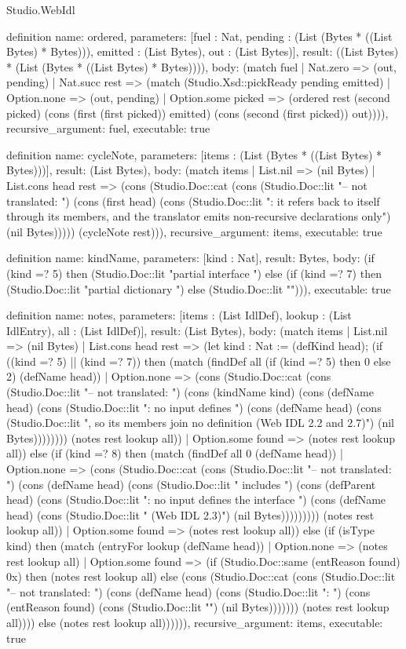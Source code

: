 \begin{lexlean}{Studio.WebIdl}
\begin{semanticmodule}
{{definition{
  name: ordered,
  parameters: [fuel : Nat, pending : (List (Bytes * ((List Bytes) * Bytes))), emitted : (List Bytes), out : (List Bytes)],
  result: ((List Bytes) * (List (Bytes * ((List Bytes) * Bytes)))),
  body: (match fuel
    | Nat.zero => (out, pending)
    | Nat.succ rest => (match (Studio.Xsd::pickReady pending emitted)
    | Option.none => (out, pending)
    | Option.some picked => (ordered rest (second picked) (cons (first (first picked)) emitted) (cons (second (first picked)) out)))),
  recursive_argument: fuel,
  executable: true
}

definition{
  name: cycleNote,
  parameters: [items : (List (Bytes * ((List Bytes) * Bytes)))],
  result: (List Bytes),
  body: (match items
    | List.nil => (nil Bytes)
    | List.cons head rest => (cons (Studio.Doc::cat (cons (Studio.Doc::lit "-- not translated: ") (cons (first head) (cons (Studio.Doc::lit ": it refers back to itself through its members, and the translator emits non-recursive declarations only\n") (nil Bytes))))) (cycleNote rest))),
  recursive_argument: items,
  executable: true
}

definition{
  name: kindName,
  parameters: [kind : Nat],
  result: Bytes,
  body: (if (kind =? 5) then (Studio.Doc::lit "partial interface ") else (if (kind =? 7) then (Studio.Doc::lit "partial dictionary ") else (Studio.Doc::lit ""))),
  executable: true
}

definition{
  name: notes,
  parameters: [items : (List IdlDef), lookup : (List IdlEntry), all : (List IdlDef)],
  result: (List Bytes),
  body: (match items
    | List.nil => (nil Bytes)
    | List.cons head rest => (let kind : Nat := (defKind head); (if ((kind =? 5) || (kind =? 7)) then (match (findDef all (if (kind =? 5) then 0 else 2) (defName head))
    | Option.none => (cons (Studio.Doc::cat (cons (Studio.Doc::lit "-- not translated: ") (cons (kindName kind) (cons (defName head) (cons (Studio.Doc::lit ": no input defines ") (cons (defName head) (cons (Studio.Doc::lit ", so its members join no definition (Web IDL 2.2 and 2.7)\n") (nil Bytes)))))))) (notes rest lookup all))
    | Option.some found => (notes rest lookup all)) else (if (kind =? 8) then (match (findDef all 0 (defName head))
    | Option.none => (cons (Studio.Doc::cat (cons (Studio.Doc::lit "-- not translated: ") (cons (defName head) (cons (Studio.Doc::lit " includes ") (cons (defParent head) (cons (Studio.Doc::lit ": no input defines the interface ") (cons (defName head) (cons (Studio.Doc::lit " (Web IDL 2.3)\n") (nil Bytes))))))))) (notes rest lookup all))
    | Option.some found => (notes rest lookup all)) else (if (isType kind) then (match (entryFor lookup (defName head))
    | Option.none => (notes rest lookup all)
    | Option.some found => (if (Studio.Doc::same (entReason found) 0x) then (notes rest lookup all) else (cons (Studio.Doc::cat (cons (Studio.Doc::lit "-- not translated: ") (cons (defName head) (cons (Studio.Doc::lit ": ") (cons (entReason found) (cons (Studio.Doc::lit "\n") (nil Bytes))))))) (notes rest lookup all)))) else (notes rest lookup all)))))),
  recursive_argument: items,
  executable: true
}

}}
\end{semanticmodule}
\end{lexlean}

